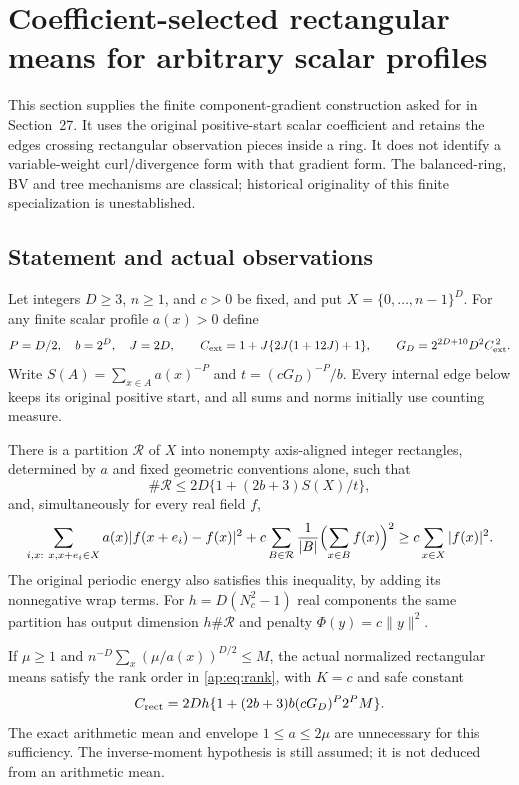 \section{Coefficient-selected rectangular means for arbitrary scalar profiles}
\label{sec:balanced223}
This section supplies the finite component-gradient construction asked for
in Section~27. It uses the original positive-start scalar coefficient and
retains the edges crossing rectangular observation pieces inside a ring.
It does not identify a variable-weight curl/divergence form with that gradient
form. The balanced-ring, BV and tree mechanisms are classical;
historical originality of this finite specialization is unestablished.

\subsection{Statement and actual observations}
Let integers $D\ge3$, $n\ge1$, and $c>0$ be fixed, and put
$X=\{0,\ldots,n-1\}^D$. For any finite scalar profile $a(x)>0$ define
\[
 P=D/2,\quad b=2^D,\quad J=2D,\qquad
 C_{\rm ext}=1+J\{2J(1+12J)+1\},\qquad
 G_D=2^{2D+10}D^2C_{\rm ext}^{\,2}.
\]
Write $S(A)=\sum_{x\in A}a(x)^{-P}$ and
$t=(cG_D)^{-P}/b$. Every internal edge below keeps its original positive
start, and all sums and norms initially use counting measure.
\begin{theorem}\label{thm:balanced223}
There is a partition $\mathcal R$ of $X$ into nonempty axis-aligned integer
rectangles, determined by $a$ and fixed geometric conventions alone, such that
\[
 \#\mathcal R\le2D\{1+(2b+3)S(X)/t\},
\]
and, simultaneously for every real field $f$,
\begin{equation}\label{eq:balanced223-final}
 \sum_{i,x:\ x,x+e_i\in X}a(x)|f(x+e_i)-f(x)|^2
 +c\sum_{B\in\mathcal R}\frac1{|B|}\Bigl(\sum_{x\in B}f(x)\Bigr)^2
 \ge c\sum_{x\in X}|f(x)|^2.
\end{equation}
The original periodic energy also satisfies this inequality, by adding
its nonnegative wrap terms. For $h=D(N_c^2-1)$ real components the same
partition has output dimension $h\#\mathcal R$ and penalty $\Phi(y)=c\|y\|^2$.
\end{theorem}
\begin{corollary}\label{cor:balanced223-moment}
If $\mu\ge1$ and
$n^{-D}\sum_x(\mu/a(x))^{D/2}\le M$, the actual normalized rectangular
means satisfy the rank order in \eqref{ap:eq:rank}, with $K=c$ and safe constant
\[
 C_{\rm rect}=2Dh\{1+(2b+3)b(cG_D)^P2^PM\}.
\]
The exact arithmetic mean and envelope $1\le a\le2\mu$ are unnecessary
for this sufficiency. The inverse-moment hypothesis is still assumed;
it is not deduced from an arithmetic mean.
\end{corollary}
